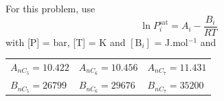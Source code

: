 \documentclass[calculator,steamtables,allquestions,datasheet,resit,solutions]{exam_newMarcus2}
\newcommand{\frc}{\displaystyle\frac}
\begin{document}
\begin{question}
{}

For this problem, use 
\begin{displaymath}
   \ln P_{i}^{\text{sat}} = A_{i} - \frc{B_{i}}{RT}
\end{displaymath} 
with [P] = bar, [T] = K and $\left[\text{B}_{i}\right]$ = J.mol$^{-1}$ and
    \begin{center}
       \begin{tabular}{l l l} 
          $A_{nC_{5}}=10.422$ & $A_{nC_{6}}=10.456$ & $A_{nC_{7}}=11.431$ \\
          $B_{nC_{5}}=26799$  & $B_{nC_{6}}=29676$  & $B_{nC_{7}}=35200$  
       \end{tabular}
    \end{center}
%
\end{question}

\clearpage
\end{document}
